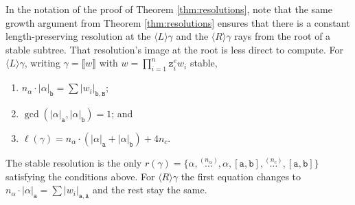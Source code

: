 \documentclass{article}
\begin{document}
	In the notation of the proof of Theorem \ref{thm:resolutions}, note that the same growth argument from Theorem \ref{thm:resolutions} ensures that there is a constant length-preserving resolution at the $\langle L \rangle\gamma$ and the $\langle R \rangle\gamma$ rays from the root of a stable subtree. That resolution's image at the root is less direct to compute. For $\langle L \rangle \gamma$, writing $\gamma=\llbracket w\rrbracket$ with $w=\prod_{i=1}^n \mathtt{z}^e_i w_i$ stable,
	\begin{enumerate}
		\item $n_\alpha\cdot |\alpha|_\mathtt{b}=\sum |w_i|_{\mathtt{b},\mathtt{B}}$;
		\item $\gcd(|\alpha|_\mathtt{a},|\alpha|_\mathtt{b})=1$; and
		\item  $\ell(\gamma)=n_\alpha\cdot (|\alpha|_\mathtt{a}+|\alpha|_\mathtt{b})+4n_c$.
	\end{enumerate}
	The stable resolution is the only $r(\gamma)=\{\alpha,\overset{(n_\alpha)}{\hdots},\alpha, [\mathtt{a},\mathtt{b}],\overset{(n_c)}{\hdots},[\mathtt{a},\mathtt{b}]\}$ satisfying the conditions above. For $\langle R \rangle \gamma$ the first equation changes to $n_\alpha\cdot |\alpha|_\mathtt{a}=\sum |w_i|_{\mathtt{a},\mathtt{A}}$ and the rest stay the same.
	
\end{document}
